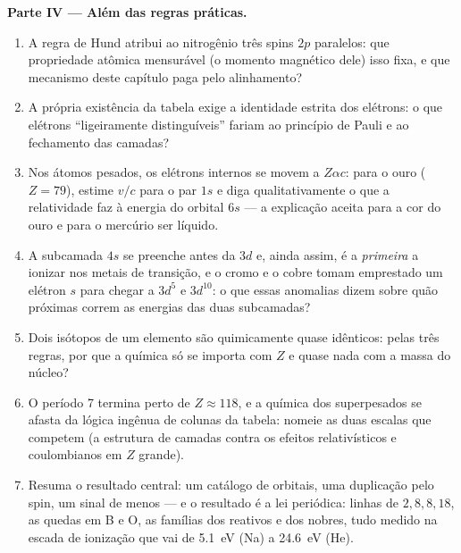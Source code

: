 \begin{problem}
\medskip\noindent\textbf{Parte IV --- Além das regras práticas.}
\begin{enumerate}[resume]
  \item A regra de Hund atribui ao nitrogênio três spins $2p$
        paralelos: que propriedade atômica mensurável (o momento
        magnético dele) isso fixa, e que mecanismo deste capítulo paga
        pelo alinhamento?
  \item A própria existência da tabela exige a identidade estrita dos
        elétrons: o que elétrons ``ligeiramente distinguíveis'' fariam
        ao princípio de Pauli e ao fechamento das camadas?
  \item Nos átomos pesados, os elétrons internos se movem a
        $Z\alpha c$: para o ouro ($Z = 79$), estime $v/c$ para o par
        $1s$ e diga qualitativamente o que a relatividade faz à energia
        do orbital $6s$ --- a explicação aceita para a cor do ouro e
        para o mercúrio ser líquido.
  \item A subcamada $4s$ se preenche antes da $3d$ e, ainda assim, é a
        \emph{primeira} a ionizar nos metais de transição, e o cromo e
        o cobre tomam emprestado um elétron $s$ para chegar a $3d^5$ e
        $3d^{10}$: o que essas anomalias dizem sobre quão próximas
        correm as energias das duas subcamadas?
  \item Dois isótopos de um elemento são quimicamente quase idênticos:
        pelas três regras, por que a química só se importa com $Z$ e
        quase nada com a massa do núcleo?
  \item O período 7 termina perto de $Z \approx 118$, e a química dos
        superpesados se afasta da lógica ingênua de colunas da tabela:
        nomeie as duas escalas que competem (a estrutura de camadas
        contra os efeitos relativísticos e coulombianos em $Z$ grande).
  \item Resuma o resultado central: um catálogo de orbitais, uma
        duplicação pelo spin, um sinal de menos --- e o resultado é a
        lei periódica: linhas de $2, 8, 8, 18$, as quedas em B e O, as
        famílias dos reativos e dos nobres, tudo medido na escada de
        ionização que vai de \qty{5.1}{eV} (Na) a
        \qty{24.6}{eV} (He).
\end{enumerate}
\end{problem}
